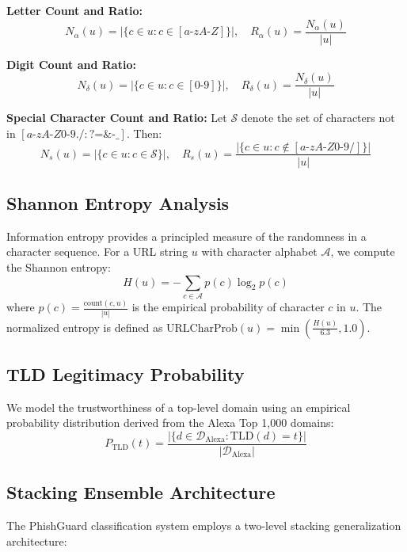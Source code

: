\documentclass[conference]{IEEEtran}
\begin{document}
\textbf{Letter Count and Ratio:}
\begin{equation}
N_{\alpha}(u) = |\{c \in u : c \in [a\text{-}zA\text{-}Z]\}|, \quad R_{\alpha}(u) = \frac{N_{\alpha}(u)}{|u|}
\end{equation}

\textbf{Digit Count and Ratio:}
\begin{equation}
N_{\delta}(u) = |\{c \in u : c \in [0\text{-}9]\}|, \quad R_{\delta}(u) = \frac{N_{\delta}(u)}{|u|}
\end{equation}

\textbf{Special Character Count and Ratio:}
Let $\mathcal{S}$ denote the set of characters not in $[a\text{-}zA\text{-}Z0\text{-}9./:?\text{=}\&\text{-}\_]$. Then:
\begin{equation}
N_s(u) = |\{c \in u : c \in \mathcal{S}\}|, \quad R_s(u) = \frac{|\{c \in u : c \notin [a\text{-}zA\text{-}Z0\text{-}9/]\}|}{|u|}
\end{equation}

\subsection{Shannon Entropy Analysis}
Information entropy provides a principled measure of the randomness in a character sequence. For a URL string $u$ with character alphabet $\mathcal{A}$, we compute the Shannon entropy:
\begin{equation}
H(u) = -\sum_{c \in \mathcal{A}} p(c) \log_2 p(c)
\end{equation}
where $p(c) = \frac{\text{count}(c, u)}{|u|}$ is the empirical probability of character $c$ in $u$. The normalized entropy is defined as $\text{URLCharProb}(u) = \min\left(\frac{H(u)}{6.3}, 1.0\right)$.

\subsection{TLD Legitimacy Probability}
We model the trustworthiness of a top-level domain using an empirical probability distribution derived from the Alexa Top 1,000 domains:
\begin{equation}
P_{\text{TLD}}(t) = \frac{|\{d \in \mathcal{D}_{\text{Alexa}} : \text{TLD}(d) = t\}|}{|\mathcal{D}_{\text{Alexa}}|}
\end{equation}

\subsection{Stacking Ensemble Architecture}
The PhishGuard classification system employs a two-level stacking generalization architecture:
\end{document}
